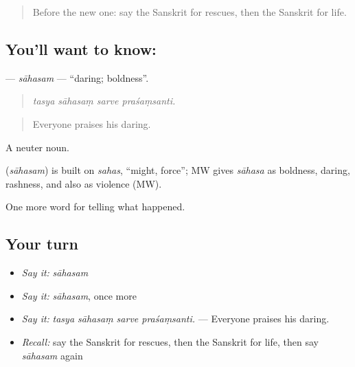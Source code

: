 \label{lesson:SA-C305-sahasam}



\begin{quote}
Before the new one: say the Sanskrit for rescues, then the Sanskrit for life.
\end{quote}

\subsection*{You'll want to know: }
\textbf{} — \emph{sāhasam} — \textquotedblleft{}daring; boldness\textquotedblright{}.

\begin{quote}
   
\end{quote}

\begin{quote}
\emph{tasya sāhasaṃ sarve praśaṃsanti.}
\end{quote}

\begin{quote}
Everyone praises his daring.
\end{quote}

A neuter noun.

\begin{cousinweb}
\textbf{} (\emph{sāhasam}) is built on \emph{sahas}, \textquotedblleft{}might, force\textquotedblright{}; MW gives \emph{sāhasa} as boldness, daring, rashness, and also as violence (MW).
\end{cousinweb}

\begin{grammarlens}[title={What you've built}]
One more word for telling what happened.
\end{grammarlens}

\subsection*{Your turn}
\begin{itemize}
\raggedright
  \item \emph{Say it:} \emph{sāhasam}
  \item \emph{Say it:} \emph{sāhasam}, once more
  \item \emph{Say it:} \emph{tasya sāhasaṃ sarve praśaṃsanti.} — Everyone praises his daring.
  \item \emph{Recall:} say the Sanskrit for rescues, then the Sanskrit for life, then say \emph{sāhasam} again
\end{itemize}

